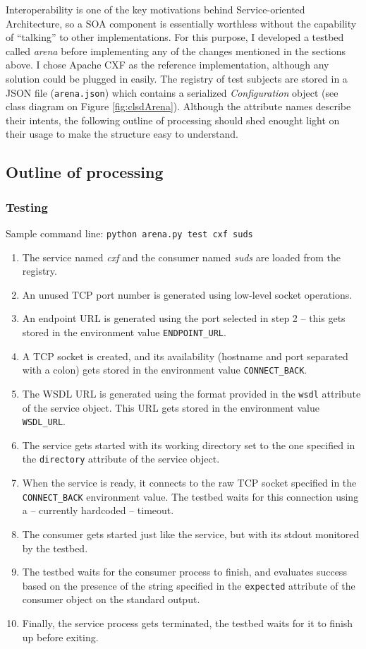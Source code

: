 Interoperability is one of the key motivations behind Service-oriented Architecture, so a SOA component is essentially worthless without the capability of ``talking'' to other implementations. For this purpose, I developed a testbed called \emph{arena} before implementing any of the changes mentioned in the sections above. I chose Apache CXF as the reference implementation, although any solution could be plugged in easily. The registry of test subjects are stored in a JSON file (\verb|arena.json|) which contains a serialized \emph{Configuration} object (see class diagram on Figure \ref{fig:clsdArena}). Although the attribute names describe their intents, the following outline of processing should shed enought light on their usage to make the structure easy to understand.

\subsection{Outline of processing}

\subsubsection{Testing}

Sample command line: \verb|python arena.py test cxf suds|

\begin{enumerate}
 \item The service named \emph{cxf} and the consumer named \emph{suds} are loaded from the registry.
 \item An unused TCP port number is generated using low-level socket operations.
 \item An endpoint URL is generated using the port selected in step 2 -- this gets stored in the environment value \verb|ENDPOINT_URL|.
 \item A TCP socket is created, and its availability (hostname and port separated with a colon) gets stored in the environment value \verb|CONNECT_BACK|.
 \item The WSDL URL is generated using the format provided in the \verb|wsdl| attribute of the service object. This URL gets stored in the environment value \verb|WSDL_URL|.
 \item The service gets started with its working directory set to the one specified in the \verb|directory| attribute of the service object.
 \item When the service is ready, it connects to the raw TCP socket specified in the \verb|CONNECT_BACK| environment value. The testbed waits for this connection using a -- currently hardcoded -- timeout.
 \item The consumer gets started just like the service, but with its stdout monitored by the testbed.
 \item The testbed waits for the consumer process to finish, and evaluates success based on the presence of the string specified in the \verb|expected| attribute of the consumer object on the standard output.
 \item Finally, the service process gets terminated, the testbed waits for it to finish up before exiting.
\end{enumerate}

